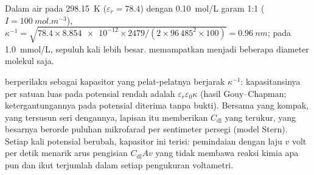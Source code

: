 \begin{example}\label{ex:b3:electrode-kinetics:debye}
Dalam air pada \qty{298.15}{K} ($\varepsilon_r = 78.4$) dengan \qty{0.10}{mol/L}
garam 1:1 ($I = \qty{100}{mol.m^{-3}}$),
$\kappa^{-1} = \sqrt{78.4 \times \num{8.854e-12} \times 2479/(2 \times 96\,485^2 \times 100)} = \qty{0.96}{nm}$;
pada \qty{1.0}{mmol/L}, sepuluh kali lebih besar. 
memampatkan  menjadi beberapa diameter molekul saja.
\end{example}

 berperilaku sebagai kapasitor yang pelat-pelatnya berjarak
$\kappa^{-1}$: kapasitansinya per satuan luas pada potensial rendah adalah
$\varepsilon_r\varepsilon_0\kappa$ (hasil Gouy--Chapman; ketergantungannya pada
potensial diterima tanpa bukti). Bersama  yang kompak,
yang tersusun seri dengannya, lapisan itu memberikan $C_{\mathrm{dl}}$ yang
terukur, yang besarnya berorde puluhan mikrofarad per sentimeter persegi
(model Stern).
Setiap kali potensial berubah, kapasitor ini terisi: pemindaian dengan laju
$v$ volt per detik menarik arus pengisian $C_{\mathrm{dl}}Av$ yang tidak membawa
reaksi kimia apa pun dan ikut terjumlah dalam setiap pengukuran voltametri.

